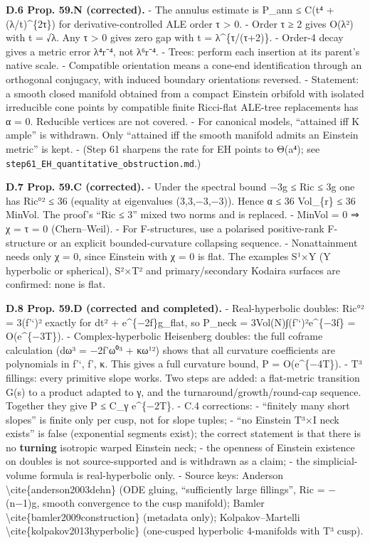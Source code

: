 \documentclass[
  10pt,
]{report}
\begin{document}
\textbf{D.6 Prop. 59.N (corrected).} - The annulus estimate is P\_ann ≤
C(t⁴ + (λ/t)\^{}\{2τ\}) for derivative-controlled ALE order τ
\textgreater{} 0. - Order τ ≥ 2 gives O(λ²) with t = √λ. Any τ
\textgreater{} 0 gives zero gap with t = λ\^{}\{τ/(τ+2)\}. - Order-4
decay gives a metric error λ⁴r⁻⁴, not λ⁶r⁻⁴. - Trees: perform each
insertion at its parent's native scale. - Compatible orientation means a
cone-end identification through an orthogonal conjugacy, with induced
boundary orientations reversed. - Statement: a smooth closed manifold
obtained from a compact Einstein orbifold with isolated irreducible cone
points by compatible finite Ricci-flat ALE-tree replacements has α = 0.
Reducible vertices are not covered. - For canonical models, ``attained
iff K ample'' is withdrawn. Only ``attained iff the smooth manifold
admits an Einstein metric'' is kept. - (Step 61 sharpens the rate for EH
points to Θ(a⁴); see \texttt{step61\_EH\_quantitative\_obstruction.md}.)

\textbf{D.7 Prop. 59.C (corrected).} - Under the spectral bound −3g ≤
Ric ≤ 3g one has \textbar Ric°\textbar² ≤ 36 (equality at eigenvalues
(3,3,−3,−3)). Hence α ≤ 36 Vol\_\{\textbar r\textbar\} ≤ 36 MinVol. The
proof's ``\textbar Ric\textbar{} ≤ 3'' mixed two norms and is replaced.
- MinVol = 0 ⇒ χ = τ = 0 (Chern--Weil). - For F-structures, use a
polarised positive-rank F-structure or an explicit bounded-curvature
collapsing sequence. - Nonattainment needs only χ = 0, since Einstein
with χ = 0 is flat. The examples S¹×Y (Y hyperbolic or spherical), S²×T²
and primary/secondary Kodaira surfaces are confirmed: none is flat.

\textbf{D.8 Prop. 59.D (corrected and completed).} - Real-hyperbolic
doubles: \textbar Ric°\textbar² = 3(f'`)² exactly for dt² +
e\^{}\{−2f\}g\_flat, so P\_neck = 3Vol(N)∫(f'`)²e\^{}\{−3f\} =
O(e\^{}\{−3T\}). - Complex-hyperbolic Heisenberg doubles: the full
coframe calculation (dω³ = −2f'ω⁰³ + κω¹²) shows that all curvature
coefficients are polynomials in f'`, f', κ. This gives a full curvature
bound, P = O(e\^{}\{−4T\}). - T³ fillings: every primitive slope works.
Two steps are added: a flat-metric transition G(s) to a product adapted
to γ, and the turnaround/growth/round-cap sequence. Together they give P
≤ C\_γ e\^{}\{−2T\}. - C.4 corrections: - ``finitely many short slopes''
is finite only per cusp, not for slope tuples; - ``no Einstein T³×I neck
exists'' is false (exponential segments exist); the correct statement is
that there is no \textbf{turning} isotropic warped Einstein neck; - the
openness of Einstein existence on doubles is not source-supported and is
withdrawn as a claim; - the simplicial-volume formula is real-hyperbolic
only. - Source keys: Anderson \textbackslash cite\{anderson2003dehn\}
(ODE gluing, ``sufficiently large fillings'', Ric = −(n−1)g, smooth
convergence to the cusp manifold); Bamler
\textbackslash cite\{bamler2009construction\} (metadata only);
Kolpakov--Martelli \textbackslash cite\{kolpakov2013hyperbolic\}
(one-cusped hyperbolic 4-manifolds with T³ cusp).
\end{document}
